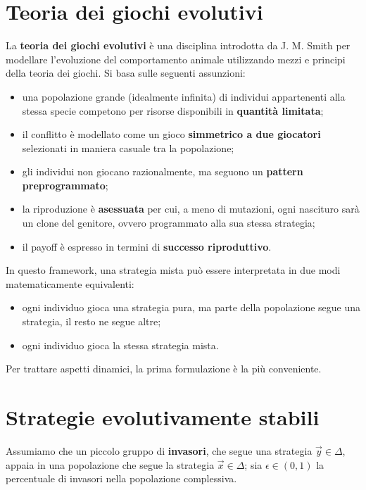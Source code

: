 \section{Teoria dei giochi evolutivi}

La \textbf{teoria dei giochi evolutivi} è una disciplina introdotta da J. M. Smith per modellare l'evoluzione del comportamento animale utilizzando mezzi e principi della teoria dei giochi. Si basa sulle seguenti assunzioni:
\begin{itemize}
	\item una popolazione grande (idealmente infinita) di individui appartenenti alla stessa specie competono per risorse disponibili in \textbf{quantità limitata};
	\item il conflitto è modellato come un gioco \textbf{simmetrico a due giocatori} selezionati in maniera casuale tra la popolazione;
	\item gli individui non giocano razionalmente, ma seguono un \textbf{pattern preprogrammato};
	\item la riproduzione è \textbf{asessuata} per cui, a meno di mutazioni, ogni nascituro sarà un clone del genitore, ovvero programmato alla sua stessa strategia;
	\item il payoff è espresso in termini di \textbf{successo riproduttivo}.
\end{itemize}
In questo framework, una strategia mista può essere interpretata in due modi matematicamente equivalenti:
\begin{itemize}
	\item ogni individuo gioca una strategia pura, ma parte della popolazione segue una strategia, il resto ne segue altre;
	\item ogni individuo gioca la stessa strategia mista.
\end{itemize}
Per trattare aspetti dinamici, la prima formulazione è la più conveniente.

\section{Strategie evolutivamente stabili}

Assumiamo che un piccolo gruppo di \textbf{invasori}, che segue una strategia $\vec{y} \in \Delta$, appaia in una popolazione che segue la strategia $\vec{x} \in \Delta$; sia $\epsilon \in (0, 1)$ la percentuale di invasori nella popolazione complessiva.


